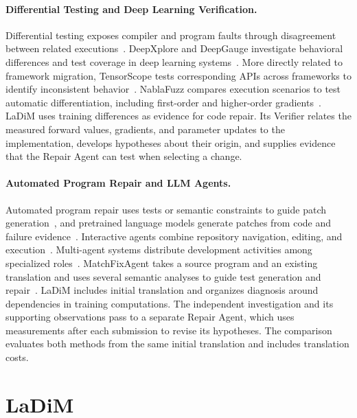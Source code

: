 \documentclass{article}
\begin{document}
\paragraph{Differential Testing and Deep Learning Verification.}
Differential testing exposes compiler and program faults through disagreement between related executions~\citep{yang2011csmith,le2014emi}. DeepXplore and DeepGauge investigate behavioral differences and test coverage in deep learning systems~\citep{pei2017deepxplore,ma2018deepgauge}. More directly related to framework migration, TensorScope tests corresponding APIs across frameworks to identify inconsistent behavior~\citep{deng2023tensorscope}. NablaFuzz compares execution scenarios to test automatic differentiation, including first-order and higher-order gradients~\citep{yang2023nablafuzz}. LaDiM uses training differences as evidence for code repair. Its Verifier relates the measured forward values, gradients, and parameter updates to the implementation, develops hypotheses about their origin, and supplies evidence that the Repair Agent can test when selecting a change.

\paragraph{Automated Program Repair and LLM Agents.}
Automated program repair uses tests or semantic constraints to guide patch generation~\citep{nguyen2013semfix}, and pretrained language models generate patches from code and failure evidence~\citep{xia2023aprplm}. Interactive agents combine repository navigation, editing, and execution~\citep{yang2024sweagent,shinn2023reflexion,chen2023selfdebugging,wang2024codeact}. Multi-agent systems distribute development activities among specialized roles~\citep{qian2023chatdev,hong2023metagpt,wu2023autogen,chen2023agentverse}. MatchFixAgent takes a source program and an existing translation and uses several semantic analyses to guide test generation and repair~\citep{ibrahimzada2025matchfixagent}. LaDiM includes initial translation and organizes diagnosis around dependencies in training computations. The independent investigation and its supporting observations pass to a separate Repair Agent, which uses measurements after each submission to revise its hypotheses. The comparison evaluates both methods from the same initial translation and includes translation costs.

\section{LaDiM}
\label{sec:method}
\end{document}
